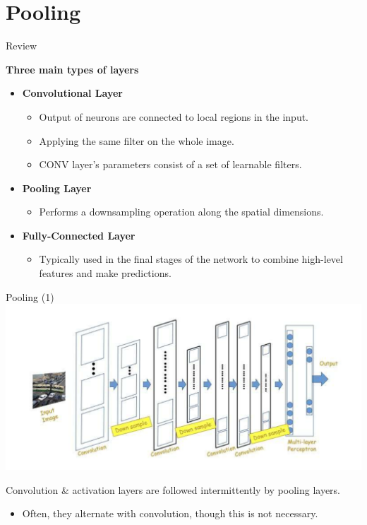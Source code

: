 \documentclass[serif, aspectratio=169]{beamer}
\begin{document}
	\section{Pooling}
	\begin{frame}{Review}
		\item \textbf{Three main types of layers}
		\begin{itemize}
			\item \textbf{Convolutional Layer}
			\begin{itemize}
				\item Output of neurons are connected to local regions in the input.
				\item Applying the same filter on the whole image.
				\item CONV layer’s parameters consist of a set of learnable filters.
			\end{itemize}
			\item \textbf{Pooling Layer}
			\begin{itemize}
				\item Performs a downsampling operation along the spatial dimensions.
			\end{itemize}
			\item \textbf{Fully-Connected Layer}
			\begin{itemize}
				\item Typically used in the final stages of the network to combine high-level features and make predictions.
			\end{itemize}
		\end{itemize}
	\end{frame}
	\begin{frame}{Pooling (1)}
		\centering
		\includegraphics[keepaspectratio, scale=0.5]{pic/pooling.png}
		\smallskip
		\begin{flushleft}
			Convolution & activation layers are followed intermittently by pooling layers.
			\begin{itemize}
				\item Often, they alternate with convolution, though this is not necessary.
			\end{itemize}
		\end{flushleft}
	\end{frame}
\end{document}
